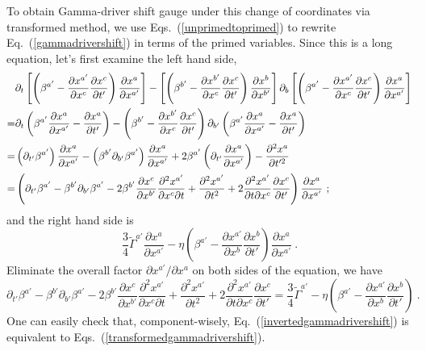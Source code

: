 To obtain Gamma-driver shift gauge under this change of coordinates via transformed method, we use Eqs.~(\ref{unprimedtoprimed}) to rewrite Eq.~(\ref{gammadrivershift}) in terms of the primed variables. Since this is a long equation, let's first examine the left hand side, 
\begin{align}
& \partial_{t}\left[\left(\beta^{a'} - \frac{\partial x^{a'}}{\partial x^{c}}\frac{\partial x^{c}}{\partial t'}\right)\frac{\partial x^{a}}{\partial x^{a'}}\right] - \left[\left(\beta^{b'} - \frac{\partial x^{b'}}{\partial x^{c}}\frac{\partial x^{c}}{\partial t'}\right)\frac{\partial x^{b}}{\partial x^{b'}}\right]\partial_{b}\left[\left(\beta^{a'} - \frac{\partial x^{a'}}{\partial x^{c}}\frac{\partial x^{c}}{\partial t'}\right)\frac{\partial x^{a}}{\partial x^{a'}}\right]\notag\\
= & \partial_{t}\left(\beta^{a'}\frac{\partial x^{a}}{\partial x^{a'}} - \frac{\partial x^{a}}{\partial t'}\right) - \left(\beta^{b'} - \frac{\partial x^{b'}}{\partial x^{c}}\frac{\partial x^{c}}{\partial t'}\right)\partial_{b'}\left(\beta^{a'}\frac{\partial x^{a}}{\partial x^{a'}} - \frac{\partial x^{a}}{\partial t'}\right)\notag\\
= & \left(\partial_{t'}\beta^{a'}\right)\frac{\partial x^{a}}{\partial x^{a'}} - \left(\beta^{b'}\partial_{b'}\beta^{a'}\right)\frac{\partial x^{a}}{\partial x^{a'}} + 2\beta^{a'}\left(\partial_{t'}\frac{\partial x^{a}}{\partial x^{a'}}\right) - \frac{\partial^{2}x^{a}}{\partial t'^{2}}\notag\\
= & \left(\partial_{t'}\beta^{a'} - \beta^{b'}\partial_{b'}\beta^{a'} - 2\beta^{b'}\frac{\partial x^{c}}{\partial x^{b'}}\frac{\partial^{2}x^{a'}}{\partial x^{c}\partial t} + \frac{\partial^{2} x^{a'}}{\partial t^{2}} + 2\frac{\partial^{2} x^{a'}}{\partial t\partial x^{c}}\frac{\partial x^{c}}{\partial t'}\right)\frac{\partial x^{a}}{\partial x^{a'}} \ ;
\end{align}
and the right hand side is
\begin{equation}
\frac{3}{4}{\tilde \Gamma}^{a'}\frac{\partial x^{a}}{\partial x^{a'}} - \eta\left(\beta^{a'} - \frac{\partial x^{a'}}{\partial x^{b}}\frac{\partial x^{b}}{\partial t'}\right)\frac{\partial x^{a}}{\partial x^{a'}} \ .
\end{equation}
Eliminate the overall factor $\partial x^{a'}/\partial x^{a}$ on both sides of the equation, we have
\begin{equation}\label{invertedgammadrivershift} 
\partial_{t'}\beta^{a'} - \beta^{b'}\partial_{b'}\beta^{a'} - 2\beta^{b'}\frac{\partial x^{c}}{\partial x^{b'}}\frac{\partial^{2}x^{a'}}{\partial x^{c}\partial t} + \frac{\partial^{2} x^{a'}}{\partial t^{2}} +  2\frac{\partial^{2} x^{a'}}{\partial t\partial x^{c}}\frac{\partial x^{c}}{\partial t'} = \frac{3}{4}{\tilde \Gamma}^{a'} - \eta\left(\beta^{a'} - \frac{\partial x^{a'}}{\partial x^{b}}\frac{\partial x^{b}}{\partial t'}\right) \ .
\end{equation}
One can easily check that, component-wisely, Eq.~(\ref{invertedgammadrivershift}) is equivalent to Eqs.~(\ref{transformedgammadrivershift}).


